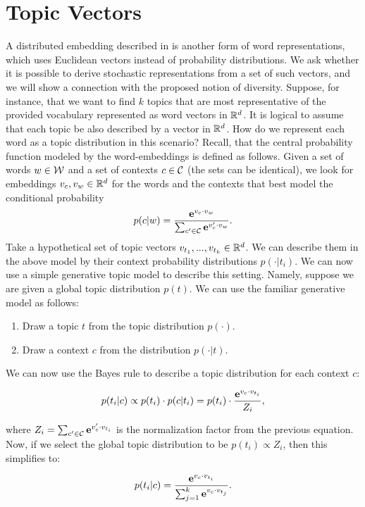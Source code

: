 \documentclass{article} %
\begin{document}
\section{Topic Vectors}

A distributed embedding described in \cite{Mikolov:2013} is another form of
word representations, which 
uses Euclidean vectors instead of probability distributions. We ask whether
it is possible to derive stochastic representations from a set of such
vectors, and we will show a connection with the proposed
notion of diversity. Suppose, for instance, that we want to find $k$
topics that are most representative of the provided vocabulary
represented as word vectors in ${\mathbb R}^d$. It is logical to assume that
each topic be also described by a vector in ${\mathbb R}^d$. How do we represent each word as a topic distribution in this
scenario? Recall, that the central probability function modeled by the
word-embeddings is defined as follows. Given a set of words $w\in{\mathcal W}$
and a set of contexts $c\in{\mathcal C}$ (the sets can be identical), we look
for embeddings $v_c,v_w\in{\mathbb R}^d$ for the words and the contexts
that best model the conditional probability  
\[p(c|w) = \frac{\operatorname{\mathbf{e}}^{v_c\cdot v_w}}{\sum_{c'\in{\mathcal C}}\operatorname{\mathbf{e}}^{v_c'\cdot v_w}}.\]
Take a hypothetical set of topic vectors $v_{t_1},...,v_{t_k}\in{\mathbb R}^d$. We can
describe them in the above model by their context probability
distributions $p(\cdot|t_i)$. We can now use a simple generative topic
model to describe this setting. Namely, suppose we are given a global
topic distribution $p(t)$. We can use the familiar generative model as
follows: 
\begin{enumerate}
\item Draw a topic $t$ from the topic distribution $p(\cdot)$.
\item Draw a context $c$ from the distribution $p(\cdot|t)$.
\end{enumerate}
We can now use the Bayes rule to describe a topic distribution for
each context $c$:

\[p(t_i|c)\propto p(t_i)\cdot p(c|t_i) = p(t_i)\cdot
\frac{\operatorname{\mathbf{e}}^{v_c\cdot v_{t_i}}}{Z_i},\]

where $Z_i=\sum_{c'\in{\mathcal C}}\operatorname{\mathbf{e}}^{v_c'\cdot v_{t_i}}$ is the normalization factor
from the previous equation. Now, if we select the global topic
distribution to be $p(t_i)\propto Z_i$, then this simplifies to:

\[p(t_i|c)=\frac{\operatorname{\mathbf{e}}^{v_c\cdot v_{t_i}}}{\sum_{j=1}^k\operatorname{\mathbf{e}}^{v_c\cdot
    v_{t_j}}}.\]
\end{document}
